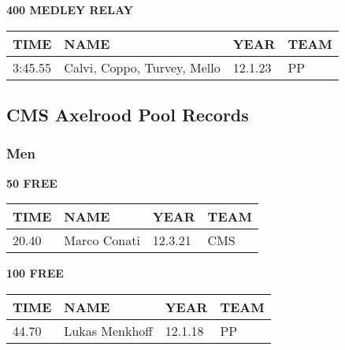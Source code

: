 \begin{table}[H]
\centering
\begin{minipage}[t]{0.6\textwidth}
\centering
\textbf{400 MEDLEY RELAY}\\[0.1cm]
\begin{tabular}{@{}p{1.8cm}p{2.8cm}p{1.2cm}p{1.4cm}@{}}
\hline
    \textbf{TIME} & \textbf{NAME} & \textbf{YEAR} & \textbf{TEAM} \\
\hline
    3:45.55 & Calvi, Coppo, Turvey, Mello & 12.1.23 & PP \\
\hline
\end{tabular}
\end{minipage}
\end{table}


\newpage

\subsection{CMS Axelrood Pool Records}
\subsubsection{Men}

\begin{table}[H]
\centering
\begin{minipage}[t]{0.48\textwidth}
\centering
\textbf{50 FREE}\\[0.1cm]
\begin{tabular}{@{}p{1.8cm}p{2.8cm}p{1.2cm}p{1.4cm}@{}}
\hline
    \textbf{TIME} & \textbf{NAME} & \textbf{YEAR} & \textbf{TEAM} \\
\hline
    20.40 & Marco Conati & 12.3.21 & CMS \\
\hline
\end{tabular}
\end{minipage}\hfill
\begin{minipage}[t]{0.48\textwidth}
\centering
\textbf{100 FREE}\\[0.1cm]
\begin{tabular}{@{}p{1.8cm}p{2.8cm}p{1.2cm}p{1.4cm}@{}}
\hline
    \textbf{TIME} & \textbf{NAME} & \textbf{YEAR} & \textbf{TEAM} \\
\hline
    44.70 & Lukas Menkhoff & 12.1.18 & PP \\
\hline
\end{tabular}
\end{minipage}
\end{table}

